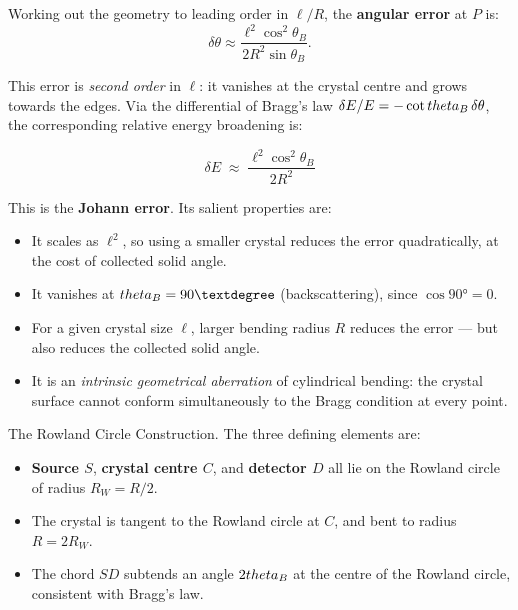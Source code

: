 Working out the geometry to leading order in $\ell/R$, the \textbf{angular error} at $P$ is:
\begin{equation}
  \delta\theta \approx \frac{\ell^2 \cos^2\theta_B}{2R^2\sin\theta_B}.
  \label{eq:angular_error}
\end{equation}

This error is \emph{second order} in $\ell$: it vanishes at the crystal centre and grows
towards the edges.  Via the differential of Bragg's law
$\delta E / E = -\cot\\theta_B\,\delta\theta$, the corresponding relative energy broadening
is:

\begin{keyresult}
\begin{equation}
  \delta E \;\approx\; \frac{\ell^2\cos^2\theta_B}{2R^2}
  \label{eq:johann_error}
\end{equation}
\end{keyresult}

This is the \textbf{Johann error}.  Its salient properties are:
\begin{itemize}
  \item It scales as $\ell^2$, so using a smaller crystal reduces the error quadratically,
        at the cost of collected solid angle.
  \item It vanishes at $\\theta_B = 90°$ (backscattering), since $\cos 90° = 0$.
  \item For a given crystal size $\ell$, larger bending radius $R$ reduces the error ---
        but also reduces the collected solid angle.
  \item It is an \emph{intrinsic geometrical aberration} of cylindrical bending: the
        crystal surface cannot conform simultaneously to the Bragg condition at every point.
\end{itemize}

The Rowland Circle Construction.
The three defining elements are:
\begin{itemize}
  \item \textbf{Source $S$}, \textbf{crystal centre $C$}, and \textbf{detector $D$} all
        lie on the Rowland circle of radius $R_W = R/2$.
  \item The crystal is tangent to the Rowland circle at $C$, and bent to radius
        $R = 2R_W$.
  \item The chord $SD$ subtends an angle $2\\theta_B$ at the centre of the Rowland circle,
        consistent with Bragg's law.
\end{itemize}

